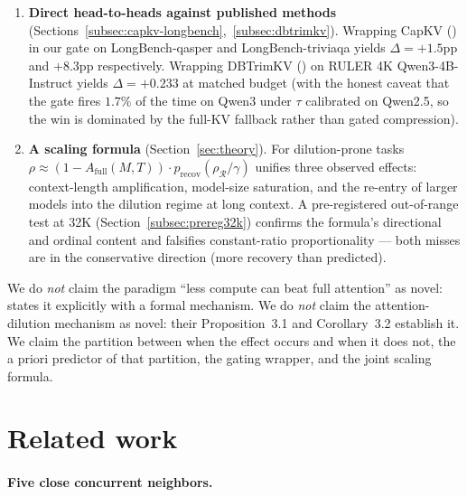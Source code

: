 \documentclass{article}
\begin{document}
\begin{enumerate}
  gated by $+13$ to $+29$pp across all four models. Cross-architecture SnapKV
  runs on Yi-1.5-9B ($\Delta = +39.0$pp) and Llama-3.1-8B ($\Delta = +10.9$pp)
  show the wrapper also helps on Llama-family models, though there part of the
  gain comes from conservative gate-closing rather than a correctly recovered
  partition (Section~\ref{sec:limitations}).
  \item \textbf{Direct head-to-heads against published methods}
  (Sections~\ref{subsec:capkv-longbench},~\ref{subsec:dbtrimkv}). Wrapping
  CapKV (\citealp{arxiv260425975}) in our gate on LongBench-qasper and
  LongBench-triviaqa yields $\Delta = +1.5$pp and $+8.3$pp respectively.
  Wrapping DBTrimKV (\citealp{arxiv260509649}) on RULER 4K Qwen3-4B-Instruct
  yields $\Delta = +0.233$ at matched budget (with the honest caveat that the
  gate fires $1.7\%$ of the time on Qwen3 under $\tau$ calibrated on Qwen2.5,
  so the win is dominated by the full-KV fallback rather than gated
  compression).
  \item \textbf{A scaling formula} (Section~\ref{sec:theory}). For
  dilution-prone tasks $\rho \approx (1 - A_{\mathrm{full}}(M, T)) \cdot
  p_{\mathrm{recov}}(\rho_{\mathcal{R}}/\gamma)$ unifies three observed effects:
  context-length amplification, model-size saturation, and the re-entry of larger
  models into the dilution regime at long context. A pre-registered
  out-of-range test at 32K (Section~\ref{subsec:prereg32k}) confirms the
  formula's directional and ordinal content and falsifies constant-ratio
  proportionality --- both misses are in the conservative direction (more
  recovery than predicted).
\end{enumerate}

We do \emph{not} claim the paradigm ``less compute can beat full attention''
as novel: \citet{arxiv260509649} states it explicitly with a formal mechanism. We
do \emph{not} claim the attention-dilution mechanism as novel: their Proposition~3.1
and Corollary~3.2 establish it. We claim the partition between when the effect
occurs and when it does not, the a priori predictor of that partition, the gating
wrapper, and the joint scaling formula.

\section{Related work}
\label{sec:related}

\paragraph{Five close concurrent neighbors.}
\end{document}
